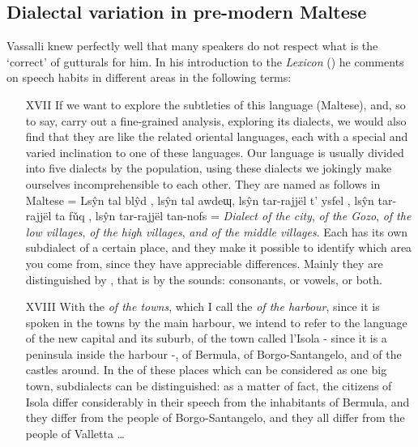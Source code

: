 \documentclass[output=paper]{langsci/langscibook}
\begin{document}
\subsection{Dialectal variation in pre-modern Maltese}

Vassalli knew perfectly well that many speakers do not respect what is the ‘correct’  of gutturals for him. In his introduction to the \textit{Lexicon} (\citeyear{Vassalli1796}) he comments on speech habits in different areas in the following terms:

\begin{itemize}
 \item[XVII]  If we want to explore the subtleties of this language (Maltese), and, so to say, carry out a fine-grained analysis, exploring its dialects, we would also find that they are like the related oriental languages, each with a special and varied inclination to one of these languages. Our language is usually divided into five dialects by the population, using these dialects we jokingly make ourselves incomprehensible to each other. They are named as follows in Maltese %
= Lsŷn tal blŷd , 
lsŷn tal {\ᴟ}awdeɰ,
lsŷn tar-r{\ጸ}ajjël t' ysfel , 
lsŷn tar-r\ጸ{}ajjël ta fǔq , 
lsŷn tar-r{\ጸ}ajjël tan-nofs  
= \textit{Dialect of the city}, 
\textit{ of the Gozo}, 
\textit{ of the low villages}, 
\textit{ of the high villages}, 
\textit{and  of the middle villages}. 
Each  has its own subdialect of a certain place, and they make it possible to identify which area you come from, since they have appreciable differences. Mainly they are distinguished by , that is by the sounds:  consonants, or vowels, or both.

\item[XVIII]  With the \textit{ of the towns}, which I call the \textit{ of the harbour}, since it is spoken in the towns by the main harbour, we intend to refer to the language of the new capital and its suburb, of the town called l'Isola - since it is a peninsula inside the harbour -, of Bermula, of Borgo-Santangelo, and of the castles around. In the  of these places which can be considered as one big town, subdialects can be distinguished: as a matter of fact, the citizens of Isola differ considerably in their speech from the inhabitants of Bermula, and they differ from the people of Borgo-Santangelo, and they all differ from the people of Valletta …


\end{itemize}
\end{document}
